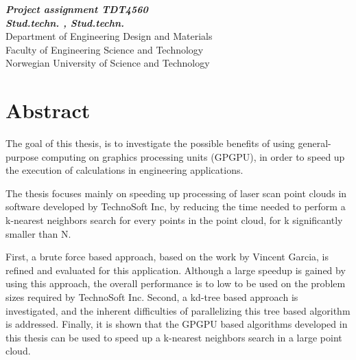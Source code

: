 \begin{center}
{\Large\bfseries \mytitle}
\end{center}

\begin{center}
{\bfseries\slshape Project assignment TDT4560}
\\[1.0cm]
{\bfseries\slshape
Stud.techn. \myauthorA, Stud.techn. \myauthorB \\}
Department of Engineering Design and Materials \\
Faculty of Engineering Science and Technology\\
Norwegian University of Science and Technology
\end{center}
\section*{Abstract}

The goal of this thesis, is to investigate the possible benefits of using general-purpose computing on graphics processing units (GPGPU), in order to speed up the execution of calculations in engineering applications.

The thesis focuses mainly on speeding up processing of laser scan point clouds in software developed by TechnoSoft Inc, by reducing the time needed to perform a k-nearest neighbors search for every points in the point cloud, for k significantly smaller than N.

First, a brute force based approach, based on the work by Vincent Garcia, is refined and evaluated for this application. Although a large speedup is gained by using this approach, the overall performance is to low to be used on the problem sizes required by TechnoSoft Inc. Second, a kd-tree based approach is investigated, and the inherent difficulties of parallelizing this tree based algorithm is addressed. Finally, it is shown that the GPGPU based algorithms developed in this thesis can be used to speed up a k-nearest neighbors search in a large point cloud.